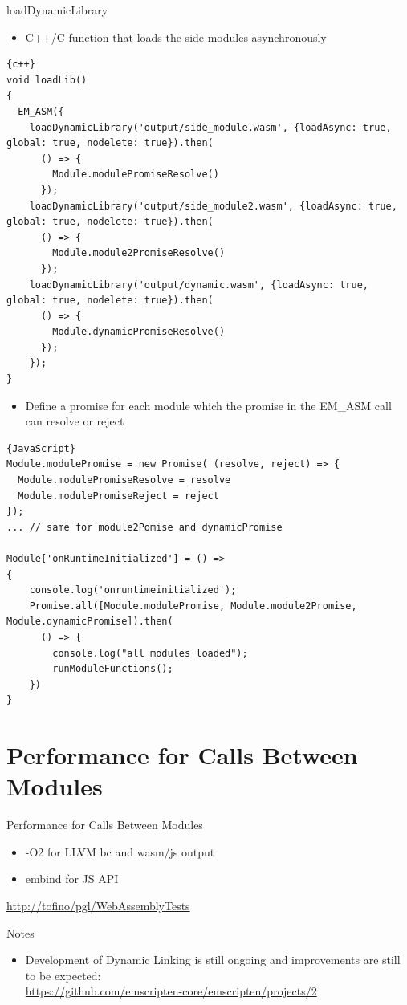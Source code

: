 \documentclass[10pt, a4paper]{beamer} %
\begin{document}
\begin{frame}{loadDynamicLibrary}
  \begin{itemize}
    \item C++/C function that loads the side modules asynchronously
  \end{itemize}
  \begin{lstlisting}{c++}
void loadLib()
{
  EM_ASM({
    loadDynamicLibrary('output/side_module.wasm', {loadAsync: true, global: true, nodelete: true}).then(
      () => {
        Module.modulePromiseResolve() 
      });
    loadDynamicLibrary('output/side_module2.wasm', {loadAsync: true, global: true, nodelete: true}).then(
      () => {
        Module.module2PromiseResolve()
      });
    loadDynamicLibrary('output/dynamic.wasm', {loadAsync: true, global: true, nodelete: true}).then(
      () => {
        Module.dynamicPromiseResolve()
      });
    });
}
  \end{lstlisting}  

  \framebreak
  \begin{itemize}
    \item Define a promise for each module which the promise in the EM\_ASM call can resolve or reject
  \end{itemize}

  \begin{lstlisting}{JavaScript}
Module.modulePromise = new Promise( (resolve, reject) => {
  Module.modulePromiseResolve = resolve
  Module.modulePromiseReject = reject
});
... // same for module2Pomise and dynamicPromise

Module['onRuntimeInitialized'] = () =>
{
    console.log('onruntimeinitialized');
    Promise.all([Module.modulePromise, Module.module2Promise, Module.dynamicPromise]).then(
      () => {
        console.log("all modules loaded");
        runModuleFunctions();
    })
}
  \end{lstlisting}
\end{frame}



\section{Performance for Calls Between Modules}
\begin{frame}{Performance for Calls Between Modules}
  \begin{itemize}
    \item -O2 for LLVM bc and wasm/js output
    \item embind for JS API
  \end{itemize}
  \url{http://tofino/pgl/WebAssemblyTests}
\end{frame}

\begin{frame}{Notes}
  \begin{itemize}
    \item Development of Dynamic Linking is still ongoing and improvements are still to be expected: \\
    \footnotesize{\url{https://github.com/emscripten-core/emscripten/projects/2}}
  \end{itemize}
\end{frame}
\end{document}
